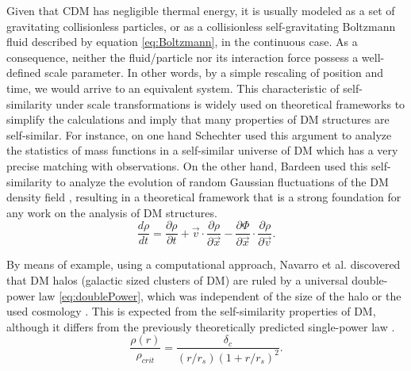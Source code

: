Given that CDM has negligible thermal energy, it is usually modeled as a set of gravitating collisionless particles, or as a collisionless self-gravitating Boltzmann fluid described by equation \eqref{eq:Boltzmann}, in the continuous case. As a consequence, neither the fluid/particle nor its interaction force possess a well-defined scale parameter. In other words, by a simple rescaling of position and time, we would arrive to an equivalent system. This characteristic of self-similarity under scale transformations is widely used on theoretical frameworks to simplify the calculations and imply that many properties of DM structures are self-similar. For instance, on one hand Schechter used this argument to analyze the statistics of mass functions in a self-similar universe of DM \cite{Schechter_1976} which has a very precise matching with observations. On the other hand, Bardeen used this self-similarity to analyze the evolution of random Gaussian fluctuations of the DM density field \cite{Bardeen_1986}, resulting in a theoretical framework that is a strong foundation for any work on the analysis of DM structures.\\


\begin{equation}
\frac{d\rho}{dt} = \frac{\partial \rho}{\partial t} +\vec{v}\cdot\frac{\partial\rho}{\partial \vec{x}}
-\frac{\partial \Phi}{\partial \vec{x}}\cdot\frac{\partial\rho}{\partial \vec{v}}.
\label{eq:Boltzmann}
\end{equation}

   
By means of example, using a computational approach, Navarro et al. discovered that DM halos (galactic sized clusters of DM) are ruled by a universal double-power law \eqref{eq:doublePower}, which was independent of the size of the halo or the used cosmology \cite{Navarro_et_al._1996,Navarro_et_al._1997,Power_et_al._2003,Navarro_et_al._2010}. This is expected from the self-similarity properties of DM, although it differs from the previously theoretically predicted single-power law  \cite{Gunn_and_Gott_1972,White_and_Zaritsky_1992}.\\

\begin{equation}
\frac{\rho(r)}{\rho_{crit}} = \frac{\delta_c}{(r/r_s)(1+r/r_s)^2}.
\label{eq:doublePower}
\end{equation}

